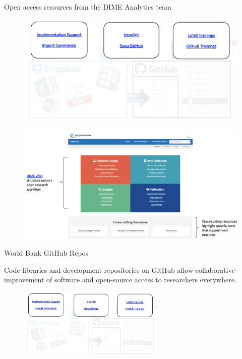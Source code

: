 \documentclass[aspectratio=169]{beamer}
\begin{document}
\begin{frame}{Open access resources from the DIME Analytics team}

\begin{figure}
	\centering
	\includegraphics[width=\linewidth]{img/Resources}
\end{figure}

\end{frame}


\begin{frame}

\begin{figure}
	\centering
	\includegraphics[width=\linewidth]{img/Resources2}
\end{figure}

\end{frame}


\begin{frame}[fragile]{World Bank GitHub Repos}
\begin{multicols}{2}	
	
Code libraries and development repositories on GitHub allow collaborative improvement of software and open-source access to researchers everywhere.
	
	\begin{figure}
		\centering
		\includegraphics[width=70mm, right]{img/Resources}
	\end{figure}
	
\end{multicols}
\end{frame}
\end{document}
